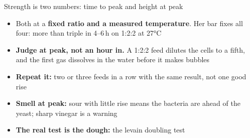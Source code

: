 \documentclass[aspectratio=169,11pt]{beamer}
\begin{document}
\begin{frame}{Strength is two numbers: time to peak and height at peak}
  \small
  \begin{itemize}
    \item Both at a \textbf{fixed ratio and a measured temperature}. Her bar fixes all four: more than triple in 4--6\,h on 1:2:2 at 27°C
    \item \textbf{Judge at peak, not an hour in.} A 1:2:2 feed dilutes the cells to a fifth, and the first gas dissolves in the water before it makes bubbles
    \item \textbf{Repeat it:} two or three feeds in a row with the same result, not one good rise
    \item \textbf{Smell at peak:} sour with little rise means the bacteria are ahead of the yeast; sharp vinegar is a warning
    \item \textbf{The real test is the dough:} the levain doubling test
  \end{itemize}
\end{frame}
\end{document}
